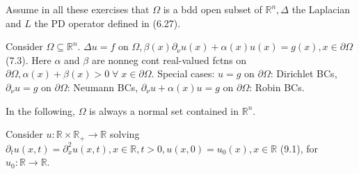 \documentclass[a4paper,landscape]{article}
\newcommand{\R}{\mathbb{R}}
\newcommand{\ra}{\rightarrow}
\begin{document}
\fontsize{6.74}{5}
\selectfont
\begin{multicols}{3}

\selectfont














%








%




%





Assume in all these exercises that $\Omega$ is a bdd open subset of $\R^n, \Delta$ the Laplacian and $L$ the PD operator defined in (6.27).

%






Consider  $\Omega \subseteq \R^n$. $\Delta u = f$ on $\Omega, \beta(x) \partial_{\nu} u(x) + \alpha(x) u(x) = g(x), x \in \partial \Omega$ (7.3). Here $\alpha$ and $\beta$ are nonneg cont real-valued fctns on $\partial \Omega, \alpha(x) + \beta(x) > 0 \; \forall \; x \in \partial \Omega$. Special cases:  $u = g$ on $\partial \Omega$: Dirichlet BCs, $\partial_{\nu}u = g$ on $\partial \Omega$: Neumann BCs, $\partial_{\nu} u + \alpha(x)u = g$ on $\partial \Omega$: Robin BCs.



In the following, $\Omega$ is always a normal set contained in $\R^n$. 
%


%
%
Consider $u: \R \times \R_+ \ra \R$ solving $\partial_t u(x,t) = \partial_x^2 u(x,t), x \in \R, t > 0, u(x,0) = u_0(x), x \in \R$ (9.1), for $u_0: \R \ra \R$. 







%






\end{multicols}
\end{document}
